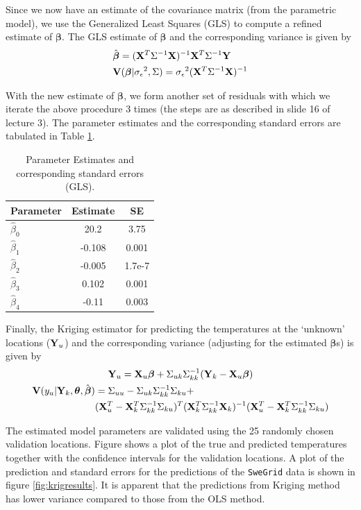 \documentclass[a4paper,10pt]{article}
\def\bY{{\bf Y}}
\def\bX{{\bf X}}
\def\bV{{\bf V}}
\def\bbeta{{\boldsymbol \beta}}
\def\btheta{{\boldsymbol \theta}}
\def\sigmaeps{{\sigma_{\epsilon}}}
\begin{document}
Since we now have an estimate of the covariance matrix (from the parametric model), we use the Generalized Least Squares (GLS) to compute a refined estimate of $\bbeta$. The GLS estimate of $\bbeta$ and the corresponding variance is given by
\begin{align*}
& \hat \bbeta = (\bX^T \Sigma^{-1} \bX)^{-1} \bX^T \Sigma^{-1} \bY \\
& \bV(\bbeta | \sigmaeps^2, \Sigma) = \sigmaeps^2 (\bX^T \Sigma^{-1} \bX)^{-1}
\end{align*}

With the new estimate of $\bbeta$, we form another set of residuals with which we iterate the above procedure 3 times (the steps are as described in slide 16 of lecture 3). The parameter estimates and the corresponding standard errors are tabulated in Table \ref{tab:glsest}.
\begin{table}[ht]
\centering
\begin{tabular}{lcc}
\hline
{\bf Parameter} & {\bf Estimate} & {\bf SE }\\
\hline
$\hat \beta_0$ & 20.2 & 3.75 \\
$\hat \beta_1$ & -0.108 & 0.001\\
$\hat \beta_2$ & -0.005 & 1.7e-7 \\
$\hat \beta_3$ & 0.102 & 0.001\\
$\hat \beta_4$ & -0.11 & 0.003\\
\hline
\end{tabular}
\caption{Parameter Estimates and corresponding standard errors (GLS).}
\label{tab:glsest}
\end{table}

Finally, the Kriging estimator for predicting the temperatures at the `unknown' locations ($\bY_u$) and the corresponding variance (adjusting for the estimated $\bbeta$s) is given by
\begin{gather*}
\bY_u = \bX_u \bbeta + \Sigma_{uk} \Sigma_{kk}^{-1} (\bY_k - \bX_u \bbeta) \\
\begin{split}
\bV(y_u| \bY_k, \btheta, \hat \bbeta) &= \Sigma_{uu} -  \Sigma_{uk} \Sigma_{kk}^{-1}\Sigma_{ku} + \\
&(\bX_u^T - \bX_k^T \Sigma_{kk}^{-1}\Sigma_{ku})^T ( \bX_k^T \Sigma_{kk}^{-1} \bX_k)^{-1} (\bX_u^T - \bX_k^T \Sigma_{kk}^{-1}\Sigma_{ku})
\end{split}
\end{gather*}

The estimated model parameters are validated using the 25 randomly chosen validation locations. Figure shows a plot of the true and predicted temperatures together with the confidence intervals for the validation locations. A plot of the prediction and standard errors for the predictions of the {\texttt{SweGrid}} data is shown in figure \ref{fig:krigresults}. It is apparent that the predictions from Kriging method has lower variance compared to those from the OLS method.
\end{document}
